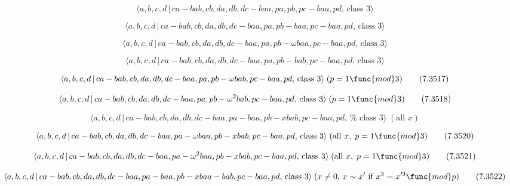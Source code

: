 \documentclass[10pt]{article}
\begin{document}
\begin{equation}
\langle a,b,c,d\,|\,ca-bab,cb,da,db,dc-baa,pa,pb,pc-baa,pd,\,\text{class }%
3\rangle  \tag{7.3513}
\end{equation}

\begin{equation}
\langle a,b,c,d\,|\,ca-bab,cb,da,db,dc-baa,pa,pb-baa,pc-baa,pd,\,\text{class 
}3\rangle  \tag{7.3514}
\end{equation}

\begin{equation}
\langle a,b,c,d\,|\,ca-bab,cb,da,db,dc-baa,pa,pb-\omega baa,pc-baa,pd,\,%
\text{class }3\rangle  \tag{7.3515}
\end{equation}

\begin{equation}
\langle a,b,c,d\,|\,ca-bab,cb,da,db,dc-baa,pa,pb-bab,pc-baa,pd,\,\text{class 
}3\rangle  \tag{7.3516}
\end{equation}

\begin{equation}
\langle a,b,c,d\,|\,ca-bab,cb,da,db,dc-baa,pa,pb-\omega bab,pc-baa,pd,\,%
\text{class }3\rangle \;(p=1\func{mod}3)  \tag{7.3517}
\end{equation}

\begin{equation}
\langle a,b,c,d\,|\,ca-bab,cb,da,db,dc-baa,pa,pb-\omega ^{2}bab,pc-baa,pd,\,%
\text{class }3\rangle \;(p=1\func{mod}3)  \tag{7.3518}
\end{equation}

\begin{equation}
\langle a,b,c,d\,|\,ca-bab,cb,da,db,dc-baa,pa-baa,pb-xbab,pc-baa,pd,\,\text{%
class }3\rangle \;(\text{all }x)  \tag{7.3519}
\end{equation}

\begin{equation}
\langle a,b,c,d\,|\,ca-bab,cb,da,db,dc-baa,pa-\omega baa,pb-xbab,pc-baa,pd,\,%
\text{class }3\rangle \;(\text{all }x,\;p=1\func{mod}3)  \tag{7.3520}
\end{equation}

\begin{equation}
\langle a,b,c,d\,|\,ca-bab,cb,da,db,dc-baa,pa-\omega
^{2}baa,pb-xbab,pc-baa,pd,\,\text{class }3\rangle \;(\text{all }x,\;p=1\func{%
mod}3)  \tag{7.3521}
\end{equation}

\begin{equation}
\langle a,b,c,d\,|\,ca-bab,cb,da,db,dc-baa,pa-baa,pb-xbaa-bab,pc-baa,pd,\,%
\text{class }3\rangle \;(x\neq 0,\,x\sim x^{\prime }\text{ if }%
x^{3}=x^{\prime 3}\func{mod}p)  \tag{7.3522}
\end{equation}
\end{document}
